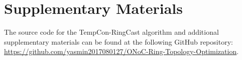\documentclass[conference]{IEEEtran}
\begin{document}
\appendices
\section{Supplementary Materials}
The source code for the TempCon-RingCast algorithm and additional supplementary materials can be found at the following GitHub repository: \href{https://github.com/yasmin2017080127/ONoC-Ring-Topology-Optimization}{https://github.com/yasmin2017080127/ONoC-Ring-Topology-Optimization}.



\end{document}
